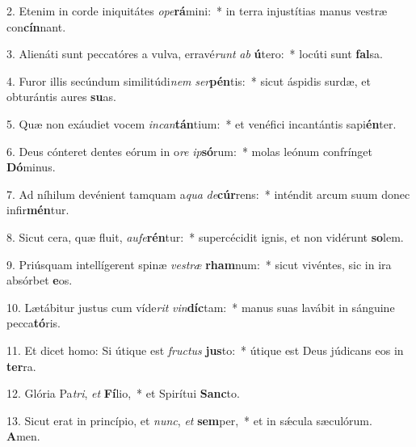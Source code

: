 2. Etenim in corde iniquitátes \textit{o}\textit{pe}\textbf{rá}mini:~*  in terra injustítias manus vestræ con\textbf{cín}nant.\

3. Alienáti sunt peccatóres a vulva, erravé\textit{runt} \textit{ab} \textbf{ú}tero:~*  locúti sunt \textbf{fal}sa.\

4. Furor illis secúndum similitúdi\textit{nem} \textit{ser}\textbf{pén}tis:~*  sicut áspidis surdæ, et obturántis aures \textbf{su}as.\

5. Quæ non exáudiet vocem \textit{in}\textit{can}\textbf{tán}tium:~*  et venéfici incantántis sapi\textbf{én}ter.\

6. Deus cónteret dentes eórum in o\textit{re} \textit{ip}\textbf{só}rum:~*  molas leónum confrínget \textbf{Dó}minus.\

7. Ad níhilum devénient tamquam a\textit{qua} \textit{de}\textbf{cúr}rens:~*  inténdit arcum suum donec infir\textbf{mén}tur.\

8. Sicut cera, quæ fluit, \textit{au}\textit{fe}\textbf{rén}tur:~*  supercécidit ignis, et non vidérunt \textbf{so}lem.\

9. Priúsquam intellígerent spinæ \textit{ves}\textit{træ} \textbf{rham}num:~*  sicut vivéntes, sic in ira absórbet \textbf{e}os.\

10. Lætábitur justus cum víde\textit{rit} \textit{vin}\textbf{díc}tam:~*  manus suas lavábit in sánguine pecca\textbf{tó}ris.\

11. Et dicet homo: Si útique est \textit{fruc}\textit{tus} \textbf{jus}to:~*  útique est Deus júdicans eos in \textbf{ter}ra.\

12. Glória Pa\textit{tri}, \textit{et} \textbf{Fí}lio,~*  et Spirítui \textbf{Sanc}to.\

13. Sicut erat in princípio, et \textit{nunc}, \textit{et} \textbf{sem}per,~*  et in sǽcula sæculórum. \textbf{A}men.\

